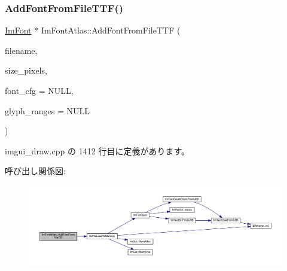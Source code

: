 \mbox{\label{struct_im_font_atlas_a26d0333bae95222ca2c2fd2886eae562}} 
\subsubsection{\texorpdfstring{Add\+Font\+From\+File\+T\+T\+F()}{AddFontFromFileTTF()}}
{\footnotesize\ttfamily \mbox{\hyperlink{struct_im_font}{Im\+Font}} $\ast$ Im\+Font\+Atlas\+::\+Add\+Font\+From\+File\+T\+TF (\begin{DoxyParamCaption}\item[{const char $\ast$}]{filename,  }\item[{float}]{size\+\_\+pixels,  }\item[{const \mbox{\hyperlink{struct_im_font_config}{Im\+Font\+Config}} $\ast$}]{font\+\_\+cfg = {\ttfamily NULL},  }\item[{const \mbox{\hyperlink{imgui_8h_af2c7badaf05a0008e15ef76d40875e97}{Im\+Wchar}} $\ast$}]{glyph\+\_\+ranges = {\ttfamily NULL} }\end{DoxyParamCaption})}



 imgui\+\_\+draw.\+cpp の 1412 行目に定義があります。

呼び出し関係図\+:\nopagebreak
\begin{figure}[H]
\begin{center}
\leavevmode
\includegraphics[width=350pt]{struct_im_font_atlas_a26d0333bae95222ca2c2fd2886eae562_cgraph}
\end{center}
\end{figure}
\mbox{\label{struct_im_font_atlas_ab43b930beb57c0b998f42f4586677956}} 
